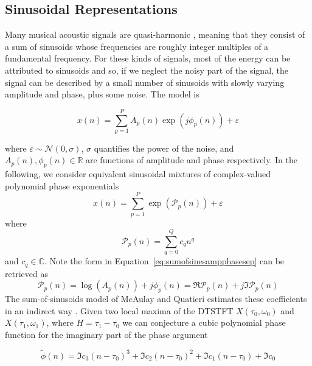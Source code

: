 \subsection{Sinusoidal Representations\label{sec:mqfmfromphase}} Many musical
acoustic signals are quasi-harmonic \cite{fletcher2012physics}, meaning that
they consist of a sum of sinusoids whose frequencies are roughly integer
multiples of a fundamental frequency. For these kinds of signals, most of the
energy can be attributed to sinusoids and so, if we neglect the noisy part of
the signal, the signal can be described by a small number of sinusoids with
slowly varying amplitude and phase, plus some noise. The model is

\begin{equation}
    \label{eq:sumofsinesampphasesep}
    x(n)=\sum_{p=1}^{P} A_p(n) \exp(j \phi_p(n)) + \varepsilon
\end{equation}

where $\varepsilon \sim \mathcal{N}(0,\sigma)$, $\sigma$ quantifies the power of
the noise, and $A_{p}(n),\phi_{p}(n) \in \mathbb{R}$ are functions of amplitude and
phase respectively. In the following, we consider equivalent sinusoidal mixtures
of complex-valued polynomial phase exponentials
\begin{equation}
    x(n)=\sum_{p=1}^{P} \exp(\mathcal{P}_p(n)) + \varepsilon
\end{equation}
where
\begin{equation}
    \mathcal{P}_p(n) = \sum_{q=0}^{Q} c_q n^{q}
\end{equation}
and $c_q \in \mathbb{C}$. Note the form in
Equation~\ref{eq:sumofsinesampphasesep} can be retrieved as
\[
    \mathcal{P}_p(n) = \log(A_p(n)) +  j \phi_p(n) = \Re{\mathcal{P}_p(n)} +
    j\Im{\mathcal{P}_p(n)}
\]
The sum-of-sinusoids model of McAulay and Quatieri estimates these coefficients
in an indirect way \cite{mcaulay1986speech}. Given two local maxima of the
DTSTFT $X(\tau_0,\omega_0)$ and $X(\tau_1,\omega_1)$, where $H = \tau_1 -
\tau_0$ we can conjecture a cubic
polynomial phase function for the imaginary part of the phase argument

\begin{equation}
    \tilde{\phi}(n) = \Im{c_3} (n-\tau_0)^3 + \Im{c_2} (n-\tau_0)^2 + \Im{c_1} (n-\tau_0) + \Im{c_0}
\end{equation}

